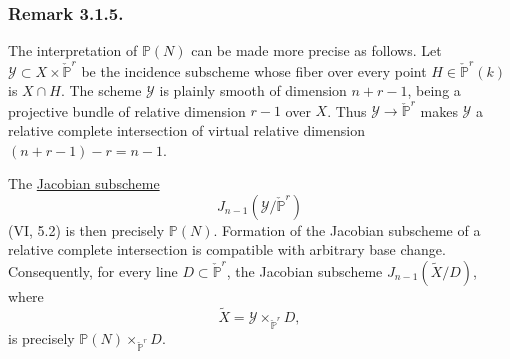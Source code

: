 \subsubsection*{Remark 3.1.5.}
The interpretation of $\mathbb P(N)$ can be made more precise as
follows.  Let
$\mathcal Y\subset X\times\check{\mathbb P}^{r}$ be the incidence
subscheme whose fiber over every point
$H\in\check{\mathbb P}^{r}(k)$ is $X\cap H$.  The scheme $\mathcal Y$
is plainly smooth of dimension $n+r-1$, being a projective bundle of
relative dimension $r-1$ over $X$.  Thus
$\mathcal Y\to\check{\mathbb P}^{r}$ makes $\mathcal Y$ a relative
complete intersection of virtual relative dimension
$(n+r-1)-r=n-1$.

The \underline{Jacobian subscheme}
\[
J_{n-1}(\mathcal Y/\check{\mathbb P}^{r})
\]
(VI, 5.2) is then precisely $\mathbb P(N)$.  Formation of the
Jacobian subscheme of a relative complete intersection is compatible
with arbitrary base change.  Consequently, for every line
$D\subset\check{\mathbb P}^{r}$, the Jacobian subscheme
$J_{n-1}(\widetilde X/D)$, where
\[
\widetilde X=\mathcal Y\times_{\check{\mathbb P}^{r}}D,
\]
is precisely
$\mathbb P(N)\times_{\check{\mathbb P}^{r}}D$.
